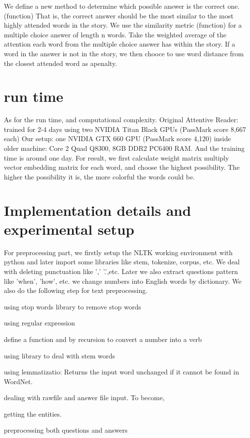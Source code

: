 \documentclass[runningheads,a4paper]{llncs}
\begin{document}
We define a new method to determine which possible answer is the correct one. (function) That is, the correct answer should be the most similar to the most highly attended words in the story. We use the similarity metric (function) for a multiple choice answer of length n words. Take the weighted average of the attention each word from the multiple choice answer has within the story. If a word in the answer is not in the story, we then chooce to use word distance from the closest attended word as apenalty.


\section{run time}
As for the run time, and computational complexity. Original Attentive Reader: trained for 2-4 days using two NVIDIA Titan Black GPUs (PassMark score 8,667 each)
Our setup: one NVIDIA GTX 660 GPU (PassMark score 4,120) inside older machine: Core 2 Quad Q8300, 8GB DDR2 PC6400 RAM. And the training time is around one day.
For result, we first calculate weight matrix multiply vector embedding matrix for each word, and choose the highest possibility. The higher the possibility it is, the more colorful the words could be.



\section{Implementation details and experimental setup}
For preprocessing part, we firstly setup the NLTK working environment with python and later import some libraries like stem, tokenize, corpus, etc. We deal with deleting punctuation like ',' '.',etc. Later we also extract questions pattern like 'when', 'how', etc. we change numbers into English words by dictionary. We also do the following step for text preprocessing. 


\begin{inparaenum}
	\item using stop words library to remove stop words
	\item using regular expression
	\item define a function and by recursion to convert a number into a verb
	\item using library to deal with stem words
	\item using lemmatizatio: Returns the input word unchanged if it cannot be found in WordNet.
	\item dealing with rawfile and answer file input. To become,
	\item getting the entities.
	\item preprocessing both questions and answers
\end{inparaenum}
\end{document}
